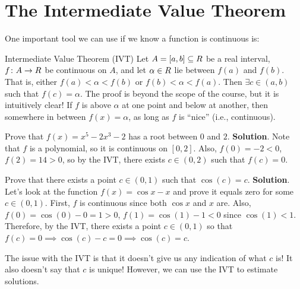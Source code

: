 \section{The Intermediate Value Theorem}
One important tool we can use if we know a function is continuous is:
\begin{Theorem}{Intermediate Value Theorem (IVT)}{}
    Let $ A=[a,b]\subseteq \relax{R} $ be a real interval, $ f\colon A\to\relax{R} $
    be continuous on $ A $, and let $ \alpha\in\relax{R} $ lie between $ f(a) $
    and $ f(b) $. That is, either $ f(a)<\alpha<f(b) $ or $ f(b)<\alpha<f(a) $.
    Then $ \exists c\in(a,b) $ such that $ f(c)=\alpha $.
    \tcblower{}
    The proof is beyond the scope of the course, but it is intuitively clear! If $ f $ is above $ \alpha $
    at one point and below at another, then somewhere in between $ f(x)=\alpha $, as long as $ f $
    is ``nice'' (i.e., continuous).
\end{Theorem}
\begin{Example}{}{}
    Prove that $ f(x)=x^5-2x^3-2 $ has a root between $ 0 $ and $ 2 $.
    \tcblower{}
    \textbf{Solution}. Note that $ f $ is a polynomial, so it is continuous on $ [0,2] $. Also,
    $ f(0)=-2<0 $, $ f(2)=14>0 $, so by the IVT, there exists $ c\in(0,2) $ such that $ f(c)=0 $.
\end{Example}
\begin{Example}{}{}
    Prove that there exists a point $ c\in(0,1) $ such that $ \cos(c)=c $.
    \tcblower{}
    \textbf{Solution}. Let's look at the function $ f(x)=\cos x-x $ and prove it equals zero for some $ c\in(0,1) $.
    First, $ f $ is continuous since both $ \cos x $ and $ x $ are. Also, $ f(0)=\cos(0)-0=1>0 $, $ f(1)=\cos(1)-1<0 $
    since $ \cos(1)<1 $. Therefore, by the IVT, there exists a point $ c\in(0,1) $ so that $ f(c)=0\implies \cos(c)-c=0\implies\cos(c)=c $.
\end{Example}
\begin{Remark}{}{}
    The issue with the IVT is that it doesn't give us any indication of what $ c $ is! It also doesn't say that $ c $
    is unique! However, we can use the IVT to estimate solutions.
\end{Remark}
